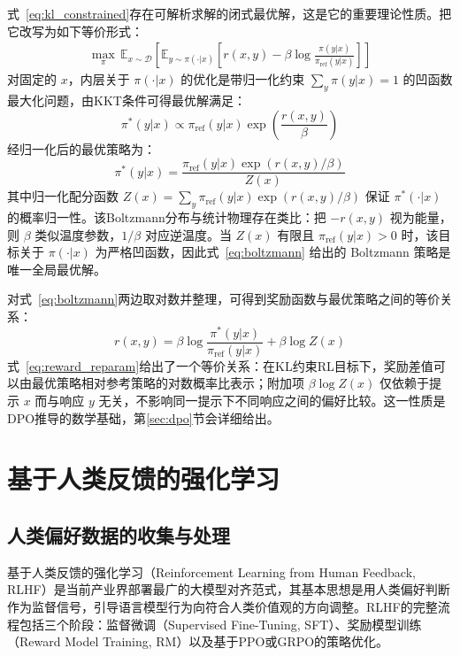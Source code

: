 式~\eqref{eq:kl_constrained}存在可解析求解的闭式最优解，这是它的重要理论性质。把它改写为如下等价形式：
\begin{align}
    \max_{\pi}\, \mathbb{E}_{x \sim \mathcal{D}}\left[\mathbb{E}_{y \sim \pi(\cdot|x)}\left[r(x, y) - \beta \log \frac{\pi(y|x)}{\pi_{\mathrm{ref}}(y|x)}\right]\right]
    \label{eq:kl_constrained_v2}
\end{align}
对固定的 $x$，内层关于 $\pi(\cdot|x)$ 的优化是带归一化约束 $\sum_y \pi(y|x) = 1$ 的凹函数最大化问题，由KKT条件可得最优解满足：
\begin{equation}
    \pi^*(y|x) \propto \pi_{\text{ref}}(y|x) \exp\left(\frac{r(x, y)}{\beta}\right)
    \label{eq:boltzmann_unnorm}
\end{equation}
经归一化后的最优策略为：
\begin{equation}
    \pi^*(y|x) = \frac{\pi_{\text{ref}}(y|x) \exp\left(r(x, y)/\beta\right)}{Z(x)}
    \label{eq:boltzmann}
\end{equation}
其中归一化配分函数 $Z(x) = \sum_y \pi_{\text{ref}}(y|x) \exp(r(x,y)/\beta)$ 保证 $\pi^*(\cdot|x)$ 的概率归一性。该Boltzmann分布与统计物理存在类比：把 $-r(x,y)$ 视为能量，则 $\beta$ 类似温度参数，$1/\beta$ 对应逆温度。当 $Z(x)$ 有限且 $\pi_{\mathrm{ref}}(y|x)>0$ 时，该目标关于 $\pi(\cdot|x)$ 为严格凹函数，因此式~\eqref{eq:boltzmann} 给出的 Boltzmann 策略是唯一全局最优解。

对式~\eqref{eq:boltzmann}两边取对数并整理，可得到奖励函数与最优策略之间的等价关系：
\begin{equation}
    r(x, y) = \beta \log \frac{\pi^*(y|x)}{\pi_{\text{ref}}(y|x)} + \beta \log Z(x)
    \label{eq:reward_reparam}
\end{equation}
式~\eqref{eq:reward_reparam}给出了一个等价关系：在KL约束RL目标下，奖励差值可以由最优策略相对参考策略的对数概率比表示；附加项 $\beta \log Z(x)$ 仅依赖于提示 $x$ 而与响应 $y$ 无关，不影响同一提示下不同响应之间的偏好比较。这一性质是DPO推导的数学基础，第\ref{sec:dpo}节会详细给出。

\section{基于人类反馈的强化学习}
\label{sec:rlhf}

\subsection{人类偏好数据的收集与处理}

基于人类反馈的强化学习（Reinforcement Learning from Human Feedback, RLHF）\cite{christiano2017deep,ouyang2022training,ziegler2019fine}是当前产业界部署最广的大模型对齐范式，其基本思想是用人类偏好判断作为监督信号，引导语言模型行为向符合人类价值观的方向调整。RLHF的完整流程包括三个阶段：监督微调（Supervised Fine-Tuning, SFT）、奖励模型训练（Reward Model Training, RM）以及基于PPO或GRPO的策略优化。


